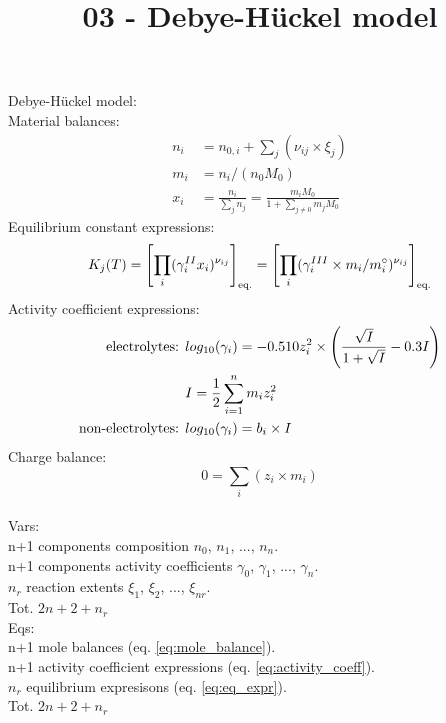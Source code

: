 \documentclass[onecolumn]{article}
\begin{document}
\title{03 - Debye-Hückel model}
\author{}
\date{}
\maketitle
Debye-Hückel model:\\
Material balances:
\begin{equation}
\begin{aligned}
\label{eq:mole_balance}
n_i &= n_{0,i} + \sum_j(\nu_{ij} \times \xi_j) \\
m_i &= n_i /(n_0 M_0) \\
x_i &= \frac{n_i}{\sum_j{n_j}}= \frac{m_i M_0}{1+\sum_{j\neq0}{m_j M_0}}
\end{aligned}
\end{equation}
Equilibrium constant expressions:
\begin{equation}
\label{eq:eq_expr}
K_j(T) = \left[ \prod_i(\gamma^{II}_i x_i)^{\nu_{ij}} \right]_{\textnormal{eq.}} = 
\left[ \prod_i(\gamma^{III}_i \times m_i/m^{\circ}_i )^{\nu_{ij}} \right]_{\textnormal{eq.}}
\end{equation}
Activity coefficient expressions:
\begin{equation}
\label{eq:activity_coeff}
\begin{aligned}
\textnormal{electrolytes: } & log_{10}(\gamma_{i}) = -0.510 z_i^2 \times \left( \frac{\sqrt{I}}{1+\sqrt{I}} -0.3 I \right) \\
& I = \frac{1}{2} \sum_{i=1}^n m_i z_i^2 \\
\textnormal{non-electrolytes: } & log_{10}(\gamma_{i}) = b_i \times I
\end{aligned}
\end{equation}
Charge balance:
\begin{equation}
0 = \sum_i(z_i \times m_i)
\end{equation}
\\
Vars: \\
n+1 components composition $n_0$, $n_1$, ..., $n_n$. \\
n+1 components activity coefficients $\gamma_0$, $\gamma_1$, ..., $\gamma_n$. \\
$n_r$ reaction extents $\xi_1$, $\xi_2$, ..., $\xi_{nr}$. \\
Tot. $2n + 2 + n_r$ \\
Eqs: \\
n+1 mole balances (eq. \ref{eq:mole_balance}). \\
n+1 activity coefficient expressions (eq. \ref{eq:activity_coeff}). \\
$n_r$ equilibrium expresisons (eq. \ref{eq:eq_expr}). \\
Tot. $2n + 2 + n_r$
\end{document}
